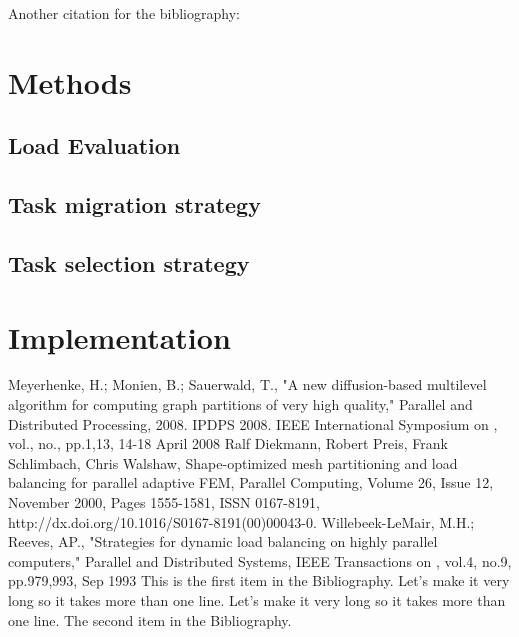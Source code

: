 \documentclass{thesis}
\begin{document}
Another citation for the bibliography:\cite{anotherbook}


\chapter{Methods}

\section {Load Evaluation}

\section{Task migration strategy}

\section{Task selection strategy}


\chapter{Implementation}
\begin{singlespace}
\begin{thebibliography}{99}
 Meyerhenke, H.; Monien, B.; Sauerwald, T., "A new diffusion-based multilevel algorithm for computing graph partitions of very high quality," Parallel and Distributed Processing, 2008. IPDPS 2008. IEEE International Symposium on , vol., no., pp.1,13, 14-18 April 2008
 Ralf Diekmann, Robert Preis, Frank Schlimbach, Chris Walshaw, Shape-optimized mesh partitioning and load balancing for parallel adaptive FEM, Parallel Computing, Volume 26, Issue 12, November 2000, Pages 1555-1581, ISSN 0167-8191, http://dx.doi.org/10.1016/S0167-8191(00)00043-0.
 Willebeek-LeMair, M.H.; Reeves, AP., "Strategies for dynamic load balancing on highly parallel computers," Parallel and Distributed Systems, IEEE Transactions on , vol.4, no.9, pp.979,993, Sep 1993
 This is the first item in the Bibliography.
Let's make it very long so it takes more than one line.
Let's make it very long so it takes more than one line.
 The second item in the Bibliography.
\end{thebibliography}
\end{singlespace}
\end{document}
